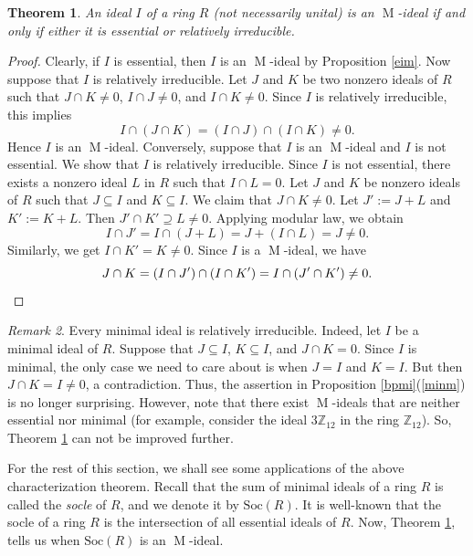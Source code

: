 \documentclass[11pt,leqno]{amsart}
\DeclareMathOperator{\m}{M}
\newtheorem{theorem}{Theorem}[section]
\theoremstyle{definition}
\theoremstyle{remark}
\newtheorem{remark}[theorem]{Remark}
\numberwithin{equation}{section}
\numberwithin{equation}{section}
\begin{document}
\begin{theorem}\label{chmi}
An ideal $I$ of a ring $R$ (not necessarily unital) is an $\m$-ideal if and only if either it is essential or relatively irreducible.
\end{theorem}

\begin{proof}
Clearly, if $I$ is essential, then $I$ is an $\m$-ideal by Proposition \ref{eim}. Now suppose that $I$ is relatively irreducible. Let $J$ and $K$ be two nonzero ideals of $R$ such that $J\cap K\neq 0$, $I\cap J\neq 0$, and $I\cap K\neq 0$. Since $I$ is relatively irreducible,
this implies
\[I\cap (J\cap K)=(I\cap J)\cap (I\cap K)\neq 0.\]
Hence $I$ is an $\m$-ideal. Conversely, suppose that $I$ is an $\m$-ideal and $I$ is not essential. We show that $I$ is relatively irreducible. Since $I$ is not essential, there exists a nonzero ideal $L$ in $R$ such that $I\cap L=0$. Let $J$ and $K$ be nonzero ideals of $R$ such that $J\subseteq I$ and $K\subseteq I$. We claim that $J\cap K\neq 0$. Let $J':=J+L$ and $K':= K+L$. Then $J'\cap K'\supseteq L \neq 0$. Applying modular law, we obtain 
\[I\cap J'=I\cap(J+L)=J+(I\cap L)=J\neq 0.\]
Similarly, we get $I\cap K'=K\neq 0$. Since $I$ is a $\m$-ideal, we have
\[ J\cap K=(I\cap J')\cap (I\cap K')=I\cap (J'\cap K')\neq 0.\qedhere\]
\end{proof}

\begin{remark}
Every minimal ideal is relatively irreducible. Indeed, let $I$ be a minimal ideal of $R$. Suppose that $J\subseteq I$, $K\subseteq I$, and $J\cap K=0$. Since $I$ is minimal, the only case we need to care about is when $J=I$ and $K=I$. But then $J\cap K=I\neq 0$, a contradiction. Thus, the assertion in Proposition \ref{bpmi}(\ref{minm}) is no longer surprising. However, note that there exist $\m$-ideals that are neither essential nor minimal (for example, consider the ideal $3\mathds{Z}_{12}$ in the ring $\mathds{Z}_{12}$). So, Theorem \ref{chmi} can not be improved further.   
\end{remark}

For the rest of this section, we shall see some applications of the above characterization theorem. 
Recall that the sum of minimal ideals of a ring $R$ is called the \emph{socle} of $R$, and we denote it by $\mathrm{Soc}(R)$. It is well-known that the socle of a ring $R$ is the intersection of all essential ideals of $R$. Now, Theorem \ref{chmi}, tells us when $\mathrm{Soc}(R)$ is an $\m$-ideal. 
\end{document}
